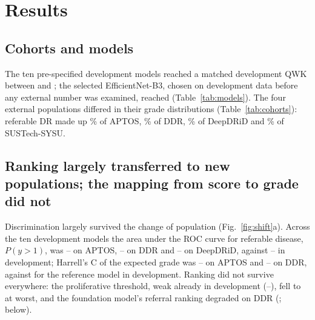 \section{Results}\label{sec:results}

\subsection{Cohorts and models}

The ten pre-specified development models reached a matched development QWK between
 and ; the selected EfficientNet-B3, chosen on
development data before any external number was examined, reached 
(Table~\ref{tab:models}). The four external populations differed in their grade distributions
(Table~\ref{tab:cohorts}): referable DR made up \% of APTOS,
\% of DDR, \% of DeepDRiD and
\% of SUSTech-SYSU.

\subsection{Ranking largely transferred to new populations; the mapping from score to grade did not}

Discrimination largely survived the change of population (Fig.~\ref{fig:shift}a). Across the
ten development models the area under the ROC curve for referable disease, $P(y>1)$, was
-- on APTOS, --
on DDR and -- on DeepDRiD, against
-- in development; Harrell's C of the expected grade was
-- on APTOS and
-- on DDR, against  for the
reference model in development. Ranking did not survive everywhere: the proliferative threshold,
weak already in development (--), fell to
 at worst, and the foundation model's referral ranking degraded on DDR
(; below).

